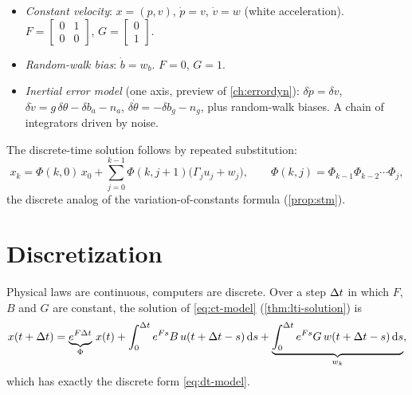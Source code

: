 \begin{example}
\label{ex:state-models}
\begin{itemize}
  \item \emph{Constant velocity}: $x = (p, v)$, $\dot p = v$, $\dot v = w$ (white acceleration). $F = \begin{bmatrix}0 & 1\\0 & 0\end{bmatrix}$, $G = \begin{bmatrix}0\\1\end{bmatrix}$.
  \item \emph{Random-walk bias}: $\dot b = w_b$. $F = 0$, $G = 1$.
  \item \emph{Inertial error model} (one axis, preview of \cref{ch:errordyn}): $\delta\dot p = \delta v$, $\delta\dot v = g\,\delta\theta - \delta b_a - n_a$,
        $\delta\dot\theta = -\delta b_g - n_g$, plus random-walk biases. A chain of integrators driven by noise.
\end{itemize}
\end{example}

The discrete-time solution follows by repeated substitution:
\begin{equation}
  x_k = \Phi(k, 0)\,x_0 + \sum_{j=0}^{k-1}\Phi(k, j+1)\big(\Gamma_ju_j + w_j\big), \qquad \Phi(k, j) = \Phi_{k-1}\Phi_{k-2}\cdots\Phi_j,
\end{equation}
the discrete analog of the variation-of-constants formula (\cref{prop:stm}).

\section{Discretization}
\label{sec:discretization}

Physical laws are continuous, computers are discrete. Over a step ${\Delta t}$ in which $F$, $B$ and $G$ are constant, the solution of \eqref{eq:ct-model}
(\cref{thm:lti-solution}) is
\begin{equation}
  x(t + {\Delta t}) = \underbrace{e^{F{\Delta t}}}_{\Phi}\,x(t) + \int_0^{\Delta t} e^{Fs}B\,u(t + {\Delta t} - s)\,\mathrm{d} s + \underbrace{\int_0^{\Delta t} e^{Fs}G\,w(t + {\Delta t} - s)\,\mathrm{d} s}_{w_k},
\end{equation}
which has exactly the discrete form \eqref{eq:dt-model}.


